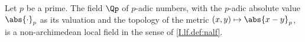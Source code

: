 Let $p$ be a prime. The field $\Qp$ of $p$-adic numbers, with the $p$-adic absolute value $\abs{\cdot}_p$ as its
valuation and the topology of the metric $(x,y)\mapsto\abs{x-y}_p$, is a non-archimedean local field in the sense of
\cref{I.lf.def:nalf}.
